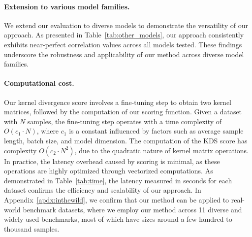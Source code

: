 




\paragraph{Extension to various model families.}
We extend our evaluation to diverse models to demonstrate the versatility of our approach. 
As presented in Table~\ref{tab:other_models}, our approach consistently exhibits near-perfect correlation values across all models tested. 
These findings underscore the robustness and applicability of our method across diverse model families.


\paragraph{Computational cost.}

Our kernel divergence score  involves a fine-tuning step to obtain two kernel matrices, followed by the computation of our scoring function.
Given a dataset with $N$ samples, the fine-tuning step operates with a time complexity of $O(c_1\cdot N)$, where $c_1$ is a constant influenced by factors such as average sample length, batch size, and model dimension.
The computation of the KDS score has complexity $O(c_2\cdot N^2)$, due to the quadratic nature of kernel matrix operations.
In practice, the latency overhead caused by scoring is minimal, as these operations are highly optimized through vectorized computations.
As demonstrated in Table~\ref{tab:time}, the latency measured in seconds for each dataset confirms the efficiency and scalability of our approach. In Appendix~\ref{apdx:inthewild}, we confirm that our method can be applied to real-world benchmark datasets, where we employ our method across 11 diverse and widely used benchmarks, most of which have sizes around a few hundred to thousand samples. 

